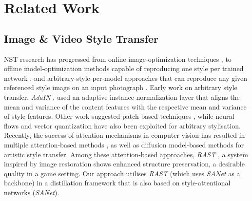 \section{Related Work}
\subsection{Image \& Video Style Transfer}

NST research has progressed from online image-optimization techniques \cite{gatys2016image}, to offline model-optimization methods capable of reproducing one style per trained network \cite{johnson2016perceptual,li2016precomputed,ulyanov2016texture,ulyanov2017improved}, and arbitrary-style-per-model approaches \cite{huang2017arbitrary} that can reproduce any given referenced style image on an input photograph \cite{ghiasi2017exploring,gu2018arbitrary,huo2021manifold,shen2018neural,svoboda2020two,xu2023learning}. Early work on arbitrary style transfer, \textit{AdaIN} \cite{huang2017arbitrary}, used an adaptive instance normalization layer that aligns the mean and variance of the content features with the respective mean and variance of style features. Other work suggested patch-based techniques \cite{chen2016fast,sheng2018avatar}, while neural flows \cite{an2021artflow} and vector quantization \cite{huang2023quantart} have also been exploited for arbitrary stylisation. Recently, the success of attention mechanisms \cite{vaswani2017attention,dosovitskiy2020image} in computer vision has resulted in multiple attention-based methods \cite{park2019arbitrary,liu2021adaattn,deng2022stytr2,luo2022consistent,ma2023rast,hong2023aespa,zhu2023all}, as well as diffusion model-based methods \cite{chung2024style,hertz2024style} for artistic style transfer. Among these attention-based approaches, \textit{RAST} \cite{ma2023rast}, a system inspired by image restoration shows enhanced structure preservation, a desirable quality in a game setting. Our approach utilises \textit{RAST} (which uses \textit{SANet} \cite{park2019arbitrary} as a backbone) in a distillation framework that is also based on style-attentional networks (\textit{SANet}).


